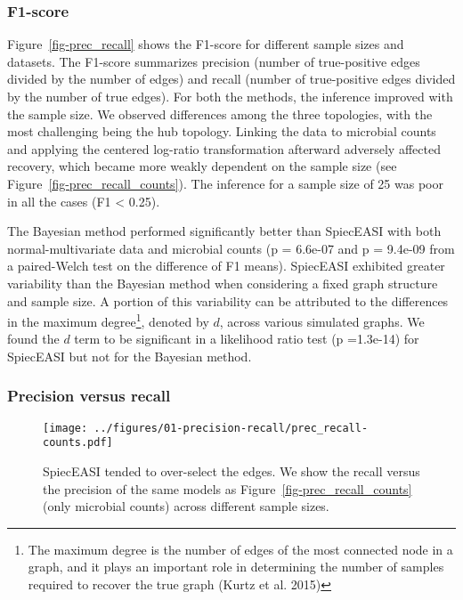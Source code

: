 \documentclass[
  a4paper,
]{article}
\begin{document}
\hypertarget{f1-score}{%
\subsubsection{F1-score}\label{f1-score}}

Figure~\ref{fig-prec_recall} shows the F1-score for different sample
sizes and datasets. The F1-score summarizes precision (number of
true-positive edges divided by the number of edges) and recall (number
of true-positive edges divided by the number of true edges). For both
the methods, the inference improved with the sample size. We observed
differences among the three topologies, with the most challenging being
the hub topology. Linking the data to microbial counts and applying the
centered log-ratio transformation afterward adversely affected recovery,
which became more weakly dependent on the sample size (see
Figure~\ref{fig-prec_recall_counts}). The inference for a sample size of
25 was poor in all the cases (F1 \textless{} 0.25).

The Bayesian method performed significantly better than SpiecEASI with
both normal-multivariate data and microbial counts (p = 6.6e-07 and p =
9.4e-09 from a paired-Welch test on the difference of F1 means).
SpiecEASI exhibited greater variability than the Bayesian method when
considering a fixed graph structure and sample size. A portion of this
variability can be attributed to the differences in the maximum
degree\footnote{The maximum degree is the number of edges of the most
  connected node in a graph, and it plays an important role in
  determining the number of samples required to recover the true graph
  (Kurtz et al. 2015)}, denoted by \(d\), across various simulated
graphs. We found the \(d\) term to be significant in a likelihood ratio
test (p =1.3e-14) for SpiecEASI but not for the Bayesian method.

\hypertarget{precision-versus-recall}{%
\subsubsection{Precision versus recall}\label{precision-versus-recall}}

\begin{figure}

{\centering \texttt{[image: ../figures/01-precision-recall/prec\_recall-counts.pdf]}

}

\caption{\label{fig-precision_recall_counts}SpiecEASI tended to
over-select the edges. We show the recall versus the precision of the
same models as Figure~\ref{fig-prec_recall_counts} (only microbial
counts) across different sample sizes.}

\end{figure}
\end{document}

